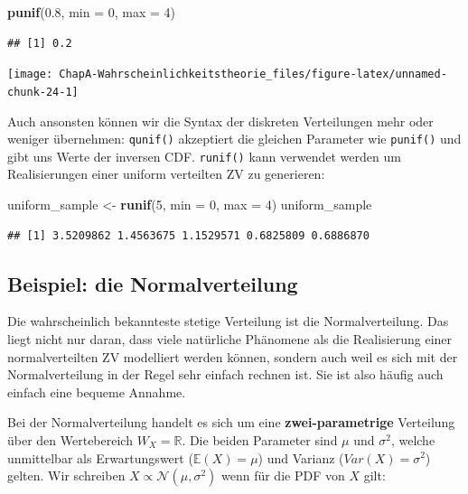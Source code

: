 \documentclass[]{book}
\newenvironment{Shaded}{\begin{snugshade}}{\end{snugshade}}
\newcommand{\KeywordTok}[1]{\textcolor[rgb]{0.13,0.29,0.53}{\textbf{#1}}}
\newcommand{\DataTypeTok}[1]{\textcolor[rgb]{0.13,0.29,0.53}{#1}}
\newcommand{\DecValTok}[1]{\textcolor[rgb]{0.00,0.00,0.81}{#1}}
\newcommand{\FloatTok}[1]{\textcolor[rgb]{0.00,0.00,0.81}{#1}}
\newcommand{\StringTok}[1]{\textcolor[rgb]{0.31,0.60,0.02}{#1}}
\newcommand{\NormalTok}[1]{#1}
\begin{document}
\begin{Shaded}
\begin{Highlighting}[]
\KeywordTok{punif}\NormalTok{(}\FloatTok{0.8}\NormalTok{, }\DataTypeTok{min =} \DecValTok{0}\NormalTok{, }\DataTypeTok{max =} \DecValTok{4}\NormalTok{)}
\end{Highlighting}
\end{Shaded}

\begin{verbatim}
## [1] 0.2
\end{verbatim}

\begin{center}\texttt{[image: ChapA-Wahrscheinlichkeitstheorie\_files/figure-latex/unnamed-chunk-24-1]} \end{center}

Auch ansonsten können wir die Syntax der diskreten Verteilungen mehr
oder weniger übernehmen: \texttt{qunif()} akzeptiert die gleichen
Parameter wie \texttt{punif()} und gibt uns Werte der inversen CDF.
\texttt{runif()} kann verwendet werden um Realisierungen einer uniform
verteilten ZV zu generieren:

\begin{Shaded}
\begin{Highlighting}[]
\NormalTok{uniform_sample <-}\StringTok{ }\KeywordTok{runif}\NormalTok{(}\DecValTok{5}\NormalTok{, }\DataTypeTok{min =} \DecValTok{0}\NormalTok{, }\DataTypeTok{max =} \DecValTok{4}\NormalTok{)}
\NormalTok{uniform_sample}
\end{Highlighting}
\end{Shaded}

\begin{verbatim}
## [1] 3.5209862 1.4563675 1.1529571 0.6825809 0.6886870
\end{verbatim}

\subsection{Beispiel: die
Normalverteilung}\label{beispiel-die-normalverteilung}

Die wahrscheinlich bekannteste stetige Verteilung ist die
Normalverteilung. Das liegt nicht nur daran, dass viele natürliche
Phänomene als die Realisierung einer normalverteilten ZV modelliert
werden können, sondern auch weil es sich mit der Normalverteilung in der
Regel sehr einfach rechnen ist. Sie ist also häufig auch einfach eine
bequeme Annahme.

Bei der Normalverteilung handelt es sich um eine
\textbf{zwei-parametrige} Verteilung über den Wertebereich
\(W_X=\mathbb{R}\). Die beiden Parameter sind \(\mu\) und \(\sigma^2\),
welche unmittelbar als Erwartungswert (\(\mathbb{E}(X)=\mu\)) und
Varianz (\(Var(X)=\sigma^2\)) gelten. Wir schreiben
\(X\propto \mathscr{N}(\mu, \sigma^2)\) wenn für die PDF von \(X\) gilt:
\end{document}
